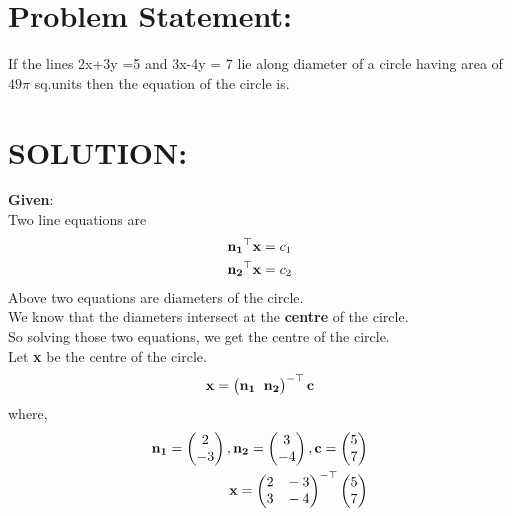 \documentclass[10pt,a4paper]{report}
\newcommand{\myvec}[1]{\ensuremath{\begin{pmatrix}#1\end{pmatrix}}}
\let\vec\mathbf
\let\vec\mathbf
\begin{document}
\begin{multicols}{2}

\raggedright \section{Problem Statement:}%
\raggedright
 If the lines 2x+3y =5 and 3x-4y = 7 lie along diameter of a circle having area of $49\pi$ sq.units then the equation of the circle is. \\
\vspace{5mm}
\raggedright \section{SOLUTION:}\vspace{2mm}

\raggedright \textbf{Given}:\vspace{2mm}\\
Two line equations are \\\vspace{1mm}
\begin{align}
\vspace{1mm}
\vec{n_1}^\top\textbf{x}={c_1}
\\
\vec{n_2}^\top\textbf{x}={c_2}
\end{align}
Above two equations are diameters of the circle.\\ \vspace{1mm}
We know that the diameters intersect at the \textbf{centre} of the circle.\\
So solving those two equations, we get the centre of the circle.
\\
Let \textbf{x} be the centre of the circle.
\begin{align}
 \textbf{x} = 
 \myvec{
\vec{n_1} \hspace{2mm} \vec{n_2} \\
}^{-\top}\vec{c}
\end{align}
where,
\begin{align}
\vec{n_1}=\myvec{2 \\ -3} ,\vec{n_2}=\myvec{3 \\-4} ,\textbf{c}=\myvec{5 \\7}
\\
 \textbf{x} =
 \myvec{
2 \hspace{3mm} -3 \\
3 \hspace{3mm} -4\\
}^{-\top}
\myvec{
      5\\
      7
  }
\end{align}


\end{multicols}
\end{document}
